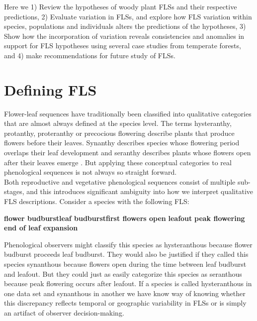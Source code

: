 \documentclass[12pt]{article}\usepackage[]{graphicx}\usepackage[]{color}
\begin{document}
\indent Here we 1) Review the hypotheses of woody plant FLSs and their respective predictions, 2) Evaluate variation in FLSs, and explore how FLS variation within species, populations and individuals alters the predictions of the hypotheses, 3) Show how the incorporation of variation reveals consistencies and anomalies in support for FLS hypotheses using several case studies from temperate forests, and 4) make recommendations for future study of FLSs. 

\section*{Defining FLS}

\indent\indent Flower-leaf sequences have traditionally been classified into qualitative categories that are almost always defined at the species level. The terms hysteranthy, protanthy, proteranthy or precocious flowering describe plants that produce flowers before their leaves. Synanthy describes species whose flowering period overlaps their leaf development and seranthy describes plants whose flowers open after their leaves emerge \citep{Lamont2011, Heinig1899}. But applying these conceptual categories to real phenological sequences is not always so straight forward.\\

\indent Both reproductive and vegetative phenological sequences consist of multiple sub-stages, and this introduces significant ambiguity into how we interpret qualitative FLS descriptions. Consider a species with the following FLS:\\
\begin{center}
\textbf{flower budburst}\rightarrow \textbf{leaf budburst}\rightarrow \textbf{first flowers open} \rightarrow \textbf{leafout} \rightarrow \textbf{peak flowering} \rightarrow \textbf{end of leaf expansion}\\
\end{center}

\indent Phenological observers might classify this species as hysteranthous because flower budburst proceeds leaf budburst. They would also be justified if they called this species synanthous because flowers open during the time between leaf budburst and leafout. But they could just as easily categorize this species as seranthous because peak flowering occurs after leafout. If a species is called hysteranthous in one data set and synanthous in another we have know way of knowing whether this discrepancy reflects temporal or geographic variability in FLSs or is simply an artifact of observer decision-making.\\
\end{document}
